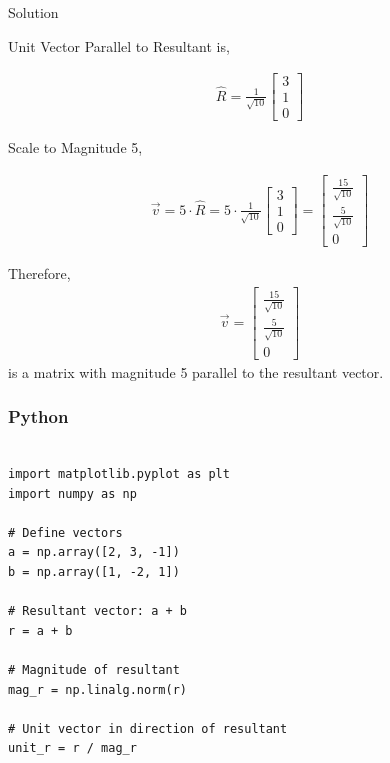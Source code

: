\documentclass{beamer}
\begin{document}
\begin{frame}{Solution}
    
Unit Vector Parallel to Resultant is,


\begin{align}
{\hat{R}} = \frac{1}{\sqrt{10}} \begin{bmatrix} 3 \\ 1 \\ 0 \end{bmatrix}
\end{align}


Scale to Magnitude 5,

\begin{align}
\vec{v} = 5 \cdot {\hat{R}} = 5 \cdot \frac{1}{\sqrt{10}} \begin{bmatrix} 3 \\ 1 \\ 0 \end{bmatrix}
= \begin{bmatrix} \frac{15}{\sqrt{10}} \\ \frac{5}{\sqrt{10}} \\ 0 \end{bmatrix}
\end{align}

Therefore,
\begin{align}
\vec{v} = \begin{bmatrix}
\frac{15}{\sqrt{10}} \\
\frac{5}{\sqrt{10}} \\
0
\end{bmatrix}
\end{align}
is a matrix with magnitude 5 parallel to the resultant vector.





\end{frame}


\begin{frame}[fragile]
    \frametitle{Python}
    \begin{lstlisting}

import matplotlib.pyplot as plt
import numpy as np

# Define vectors
a = np.array([2, 3, -1])
b = np.array([1, -2, 1])

# Resultant vector: a + b
r = a + b

# Magnitude of resultant
mag_r = np.linalg.norm(r)

# Unit vector in direction of resultant
unit_r = r / mag_r



\end{lstlisting}
\end{frame}
\end{document}
